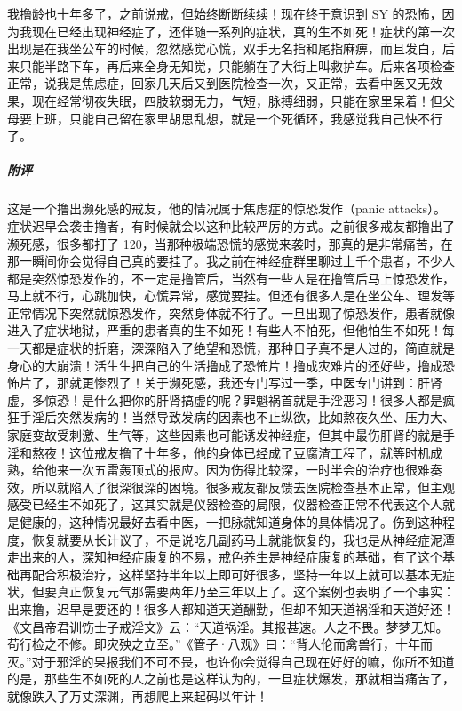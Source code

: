 \begin{case}
    我撸龄也十年多了，之前说戒，但始终断断续续！现在终于意识到 SY 的恐怖，因为我现在已经出现神经症了，还伴随一系列的症状，真的生不如死！症状的第一次出现是在我坐公车的时候，忽然感觉心慌，双手无名指和尾指麻痹，而且发白，后来只能半路下车，再后来全身无知觉，只能躺在了大街上叫救护车。后来各项检查正常，说我是焦虑症，回家几天后又到医院检查一次，又正常，去看中医又无效果，现在经常彻夜失眠，四肢软弱无力，气短，脉搏细弱，只能在家里呆着！但父母要上班，只能自己留在家里胡思乱想，就是一个死循环，我感觉我自己快不行了。
    \subparagraph{附评} 这是一个撸出濒死感的戒友，他的情况属于焦虑症的惊恐发作（panic attacks）。症状迟早会袭击撸者，有时候就会以这种比较严厉的方式。之前很多戒友都撸出了濒死感，很多都打了 120，当那种极端恐慌的感觉来袭时，那真的是非常痛苦，在那一瞬间你会觉得自己真的要挂了。我之前在神经症群里聊过上千个患者，不少人都是突然惊恐发作的，不一定是撸管后，当然有一些人是在撸管后马上惊恐发作，马上就不行，心跳加快，心慌异常，感觉要挂。但还有很多人是在坐公车、理发等正常情况下突然就惊恐发作，突然身体就不行了。一旦出现了惊恐发作，患者就像进入了症状地狱，严重的患者真的生不如死！有些人不怕死，但他怕生不如死！每一天都是症状的折磨，深深陷入了绝望和恐慌，那种日子真不是人过的，简直就是身心的大崩溃！活生生把自己的生活撸成了恐怖片！撸成灾难片的还好些，撸成恐怖片了，那就更惨烈了！关于濒死感，我还专门写过一季，中医专门讲到：肝肾虚，多惊恐！是什么把你的肝肾搞虚的呢？罪魁祸首就是手淫恶习！很多人都是疯狂手淫后突然发病的！当然导致发病的因素也不止纵欲，比如熬夜久坐、压力大、家庭变故受刺激、生气等，这些因素也可能诱发神经症，但其中最伤肝肾的就是手淫和熬夜！这位戒友撸了十年多，他的身体已经成了豆腐渣工程了，就等时机成熟，给他来一次五雷轰顶式的报应。因为伤得比较深，一时半会的治疗也很难奏效，所以就陷入了很深很深的困境。很多戒友都反馈去医院检查基本正常，但主观感受已经生不如死了，这其实就是仪器检查的局限，仪器检查正常不代表这个人就是健康的，这种情况最好去看中医，一把脉就知道身体的具体情况了。伤到这种程度，恢复就要从长计议了，不是说吃几副药马上就能恢复的，我也是从神经症泥潭走出来的人，深知神经症康复的不易，戒色养生是神经症康复的基础，有了这个基础再配合积极治疗，这样坚持半年以上即可好很多，坚持一年以上就可以基本无症状，但要真正恢复元气那需要两年乃至三年以上了。这个案例也表明了一个事实：出来撸，迟早是要还的！很多人都知道天道酬勤，但却不知天道祸淫和天道好还！《文昌帝君训饬士子戒淫文》云：“天道祸淫。其报甚速。人之不畏。梦梦无知。苟行检之不修。即灾殃之立至。”《管子·八观》曰：“背人伦而禽兽行，十年而灭。”对于邪淫的果报我们不可不畏，也许你会觉得自己现在好好的嘛，你所不知道的是，那些生不如死的人之前也是这样认为的，一旦症状爆发，那就相当痛苦了，就像跌入了万丈深渊，再想爬上来起码以年计！
\end{case}

